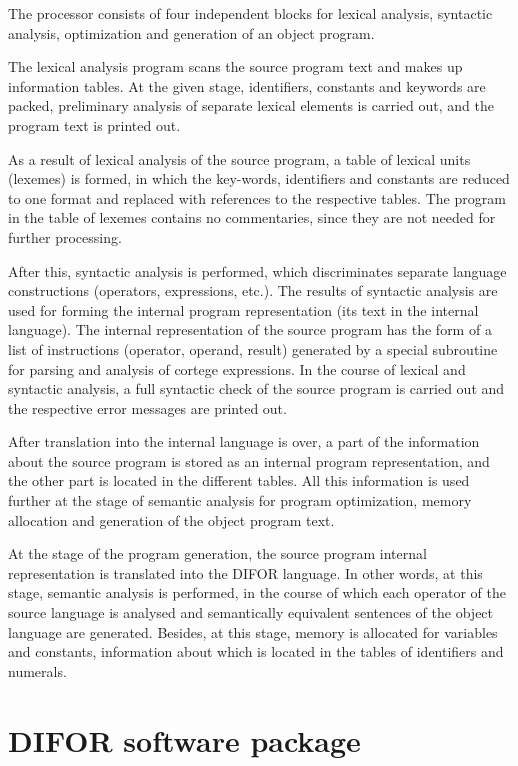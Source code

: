 The processor consists of four independent blocks for lexical analysis,
syntactic analysis, optimization and generation of an object program.

The lexical analysis program scans the source program text and makes up
information tables. At the given stage, identifiers, constants and keywords
are packed, preliminary analysis of separate lexical elements is carried
out, and the program text is printed out.

As a result of lexical analysis of the source program, a table of lexical
units (lexemes) is formed, in which the key-words, identifiers and constants
are reduced to one format and replaced with references to the respective
tables. The program in the table of lexemes contains no commentaries, since
they are not needed for further processing.

After this, syntactic analysis is performed, which discriminates separate
language constructions (operators, expressions, etc.). The results of
syntactic analysis are used for forming the internal program representation
(its text in the internal language). The internal representation of the
source program has the form of a list of instructions (operator, operand,
result) generated by a special subroutine for parsing and analysis of
cortege expressions. In the course of lexical and syntactic analysis, a full
syntactic check of the source program is carried out and the respective
error messages are printed out.

After translation into the internal language is over, a part of the
information about the source program is stored as an internal program
representation, and the other part is located in the different tables. All
this information is used further at the stage of semantic analysis for
program optimization, memory allocation and generation of the object program
text.

At the stage of the program generation, the source program internal
representation is translated into the DIFOR language. In other words, at
this stage, semantic analysis is performed, in the course of which each
operator of the source language is analysed and semantically equivalent
sentences of the object language are generated. Besides, at this stage,
memory is allocated for variables and constants, information about which is
located in the tables of identifiers and numerals.

\section{ DIFOR software package}

